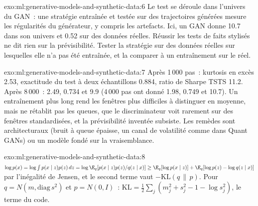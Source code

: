 \begin{solution}{exo:ml:generative-models-and-synthetic-data:6}
Le test se déroule dans l'univers du GAN~: une stratégie entraînée et testée sur des trajectoires générées mesure les régularités du générateur,
y compris les artefacts. Ici, un GAN donne 10.7 dans son univers et 0.52 sur des données réelles. Réussir les tests de faits stylisés ne dit rien
sur la prévisibilité. Tester la stratégie sur des données réelles sur lesquelles elle n'a pas été entraînée, et la comparer à un entraînement sur le réel.
\end{solution}

\begin{solution}{exo:ml:generative-models-and-synthetic-data:7}
Après 1\,000 pas~: kurtosis en excès 2.53, exactitude du test à deux échantillons 0.884, ratio de Sharpe TSTS 11.2. Après 8\,000~: 2.49, 0.734 et
9.9 (4\,000 pas ont donné 1.98, 0.749 et 10.7). Un entraînement plus long rend les fenêtres plus difficiles à distinguer en moyenne, mais ne
rétablit pas les queues, que le discriminateur voit rarement sur des fenêtres standardisées, et la prévisibilité inventée subsiste.
Les remèdes sont architecturaux (bruit à queue épaisse, un canal de volatilité comme dans Quant GANs) ou un modèle fondé sur la vraisemblance.
\end{solution}

\begin{solution}{exo:ml:generative-models-and-synthetic-data:8}
$\log p(x) = \log\int p(x\mid z)p(z)\,dz = \log\E_q[p(x\mid z)p(z)/q(z\mid x)]\ge\E_q[\log p(x\mid z)] + \E_q[\log p(z) -
\log q(z\mid x)]$ par l'inégalité de Jensen, et le second terme vaut $-\mathrm{KL}(q\,\|\,p)$. Pour $q = N(m, \mathrm{diag}\,
s^2)$ et $p = N(0, I)$~: $\mathrm{KL} = \tfrac12\sum_j(m_j^2 + s_j^2 - 1 - \log s_j^2)$, le terme du code.
\end{solution}

